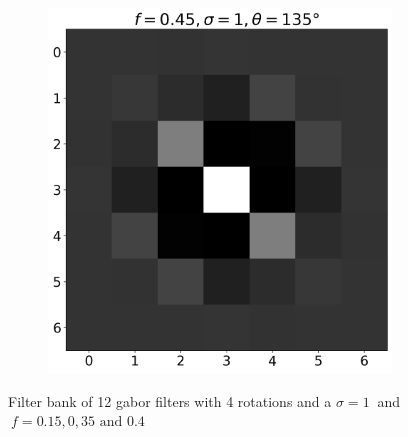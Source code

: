\documentclass[12pt,a4paper, english]{article}
\begin{document}
\begin{figure}[!htbp]
\begin{subfigure}[b]{0.3\textwidth}
      \end{subfigure}
      \begin{subfigure}[b]{0.3\textwidth}
        \includegraphics[width=\textwidth]{img/K11.png}
      \end{subfigure}
      \caption{Filter bank of 12 gabor filters with 4 rotations and a $\sigma=1\ $ and $\ f = 0.15, 0,35 \text{ and } 0.4$\label{fig:gaborbank}}%
    \end{figure}
  
\end{document}
